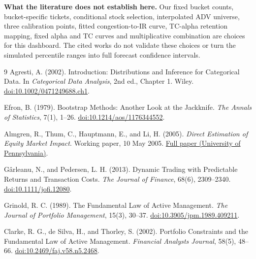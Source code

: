\documentclass[11pt,a4paper]{article}
\begin{document}
\textbf{What the literature does not establish here.} Our fixed bucket counts, bucket-specific tickets, conditional stock selection, interpolated ADV universe, three calibration points, fitted congestion-to-IR curve, TC-alpha retention mapping, fixed alpha and TC curves and multiplicative combination are choices for this dashboard. The cited works do not validate these choices or turn the simulated percentile ranges into full forecast confidence intervals.

\newpage
\begin{thebibliography}{9}
 Agresti, A. (2002).
Introduction: Distributions and Inference for Categorical Data.
In \emph{Categorical Data Analysis}, 2nd ed., Chapter 1. Wiley.
\href{https://doi.org/10.1002/0471249688.ch1}{doi:10.1002/0471249688.ch1}.

 Efron, B. (1979).
Bootstrap Methods: Another Look at the Jackknife.
\emph{The Annals of Statistics}, 7(1), 1--26.
\href{https://doi.org/10.1214/aos/1176344552}{doi:10.1214/aos/1176344552}.

 Almgren, R., Thum, C., Hauptmann, E., and Li, H. (2005).
\emph{Direct Estimation of Equity Market Impact}.
Working paper, 10 May 2005.
\href{https://www.cis.upenn.edu/~mkearns/finread/costestim.pdf}{Full paper (University of Pennsylvania)}.

 G\^arleanu, N., and Pedersen, L. H. (2013).
Dynamic Trading with Predictable Returns and Transaction Costs.
\emph{The Journal of Finance}, 68(6), 2309--2340.
\href{https://doi.org/10.1111/jofi.12080}{doi:10.1111/jofi.12080}.

 Grinold, R. C. (1989).
The Fundamental Law of Active Management.
\emph{The Journal of Portfolio Management}, 15(3), 30--37.
\href{https://doi.org/10.3905/jpm.1989.409211}{doi:10.3905/jpm.1989.409211}.

 Clarke, R. G., de Silva, H., and Thorley, S. (2002).
Portfolio Constraints and the Fundamental Law of Active Management.
\emph{Financial Analysts Journal}, 58(5), 48--66.
\href{https://doi.org/10.2469/faj.v58.n5.2468}{doi:10.2469/faj.v58.n5.2468}.
\end{thebibliography}
\end{document}
